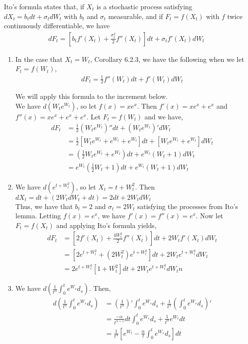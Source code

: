 \documentclass[12pt]{article}
\begin{document}
Ito's formula states that, if $X_t$ is a stochastic process satisfying $dX_t = b_tdt + \sigma_tdW_t$ with $b_t$ and $\sigma_t$ measurable, and if $F_t = f(X_t)$ with $f$ twice continuously differentiable, we have
\begin{align*}
dF_t = [b_tf'(X_t) + \frac{\sigma^2_t}{2} f''(X_t)]dt + \sigma_tf'(X_t)dW_t
\end{align*}

\begin{enumerate}[\alph*)]
\item In the case that $X_t = W_t$, Corollary 6.2.3, we have the following when we let $F_t = f(W_t)$,
\begin{align*}
dF_t = \frac{1}{2} f''(W_t)dt + f'(W_t)dW_t
\end{align*}

We will apply this formula to the increment below.\\

We have $d(W_te^{W_t})$, so let $f(x) = xe^x$. Then $f'(x) = xe^x + e^x$ and $f''(x) = xe^x + e^x + e^x$. Let $F_t = f(W_t)$ and we have,
\begin{align*}
dF_t &= \frac{1}{2} (W_te^{W_t})'' dt + (W_te^{W_t})' dW_t\\
&= \frac{1}{2} [W_te^{W_t} + e^{W_t} + e^{W_t}] dt + [W_te^{W_t} + e^{W_t}] dW_t\\
&= (\frac{1}{2} W_te^{W_t} + e^{W_t}) dt + e^{W_t}(W_t + 1) dW_t\\
&= e^{W_t} (\frac{1}{2}W_t + 1) dt + e^{W_t}(W_t + 1) dW_t
\end{align*}

\item We have $d(e^{t+W_t^2})$, so let $X_t = t + W_t^2$. Then $dX_t = dt + (2W_tdW_t+dt) = 2dt + 2W_t dW_t$\\

Thus, we have that $b_t = 2$ and $\sigma_t = 2W_t$ satisfying the processes from Ito's lemma. Letting $f(x) = e^x$, we have $f'(x) = f''(x) = e^x$. Now let $F_t = f(X_t)$ and applying Ito's formula yields,
\begin{align*}
dF_t &= [2f'(X_t) + \frac{4W_t^2}{2}f''(X_t)]dt + 2W_t f'(X_t)dW_t\\
&= [2e^{t + W_t^2} + (2W_t^2)e^{t + W_t^2}]dt + 2W_t e^{t + W_t^2} dW_t\\
&= 2e^{t+W_t^2}[1 + W_t^2] dt + 2W_te^{t+W_t^2}dW_tn
\end{align*}

\item We have $d\left(\frac{1}{t^{\alpha}} \int_0^t e^{W_s} d_s\right)$. Then,
\begin{align*}
d\left(\frac{1}{t^{\alpha}} \int_0^t e^{W_s} d_s\right) &= \left(\frac{1}{t^\alpha}\right)' \int_0^t e^{W_s} d_s + \frac{1}{t^\alpha} \left(\int_0^t e^{W_s} d_s\right)'\\
&= \frac{-\alpha}{t^{\alpha+1}} dt \int_0^t e^{W_s} d_s + \frac{1}{t^\alpha} e^{W_t} dt\\
&= \frac{1}{t^{\alpha}} \left[e^{W_t} - \frac{\alpha}{t} \int_0^t e^{W_s} d_s\right]dt
\end{align*}

\end{enumerate}
\end{document}

